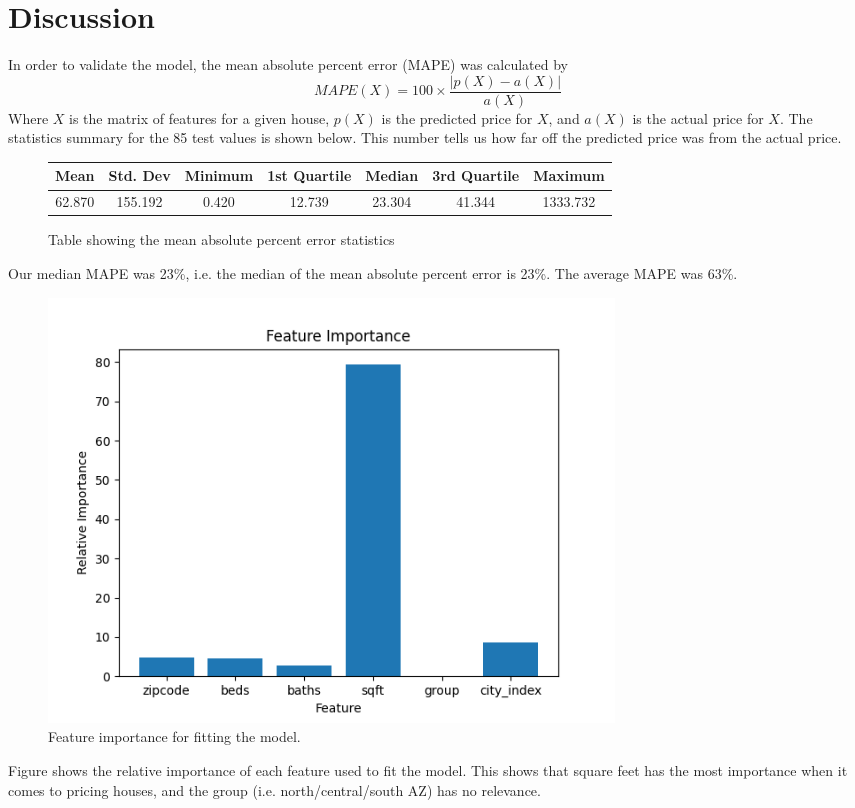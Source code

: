 \documentclass[12pt]{article}
\begin{document}
\section{Discussion}
In order to validate the model, the mean absolute percent error (MAPE) was calculated by
\begin{equation}
MAPE(X) = 100\times\frac{|p(X)-a(X)|}{a(X)}
\end{equation}
Where $X$ is the matrix of features for a given house, $p(X)$ is the predicted price for $X$, and $a(X)$ is the actual price for $X$.
The statistics summary for the 85 test values is shown below.
This number tells us how far off the predicted price was from the actual price.
\begin{figure}[H]
\centering
\begin{tabular}{|c|c|c|c|c|c|c|}
\hline
Mean & Std. Dev & Minimum & 1st Quartile & Median & 3rd Quartile & Maximum \\
\hline
62.870 & 155.192 & 0.420 & 12.739 & 23.304 & 41.344 & 1333.732 \\
\hline
\end{tabular}
\caption{Table showing the mean absolute percent error statistics}
\label{tab:uwu}
\end{figure}
Our median MAPE was 23\%, i.e. the median of the mean absolute percent error is 23\%.
The average MAPE was 63\%.
\begin{figure}[H]
    \centering
    \includegraphics[width=15cm]{featureimportance.png}
    \caption{Feature importance for fitting the model.}
    \label{fig:featureimportance}
\end{figure}
Figure \label{fig:featureimportance} shows the relative importance of each feature used to fit the model.
This shows that square feet has the most importance when it comes to pricing houses, and the group (i.e. north/central/south AZ) has no relevance.
\vspace{1em}
\end{document}

